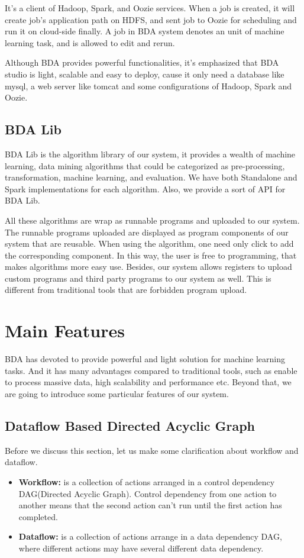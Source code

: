 \documentclass{sig-alternate-05-2015}
\begin{document}
It's a client of Hadoop, Spark, and Oozie services. When a job is created, it will create job's application path on HDFS, and sent job to Oozie for scheduling and run it on cloud-side finally. A job in BDA system denotes an unit of machine learning task, and is allowed to edit and rerun.

Although BDA provides powerful functionalities, it's emphasized that BDA studio is light, scalable and easy to deploy, cause it only need a database like mysql, a web server like tomcat and some configurations of Hadoop, Spark and Oozie.


\subsection{BDA Lib}
BDA Lib is the algorithm library of our system, it provides a wealth of machine learning, data mining algorithms that could be categorized as pre-processing, transformation, machine learning, and evaluation. We have both Standalone and Spark implementations for each algorithm. Also, we provide a sort of API for BDA Lib. 

All these algorithms are wrap as runnable programs and uploaded to our system. The runnable programs uploaded are displayed as program components of our system that are reusable. When using the algorithm, one need only click to add the corresponding component. In this way, the user is free to programming, that makes algorithms more easy use. Besides, our system allows registers to upload custom programs and third party programs to our system as well. This is different from traditional tools that are forbidden program upload.

\section{Main Features}
BDA has devoted to provide powerful and light solution for machine learning tasks. And it has many advantages compared to traditional tools, such as enable to process massive data, high scalability and performance etc. Beyond that, we are going to introduce some particular features of our system.

\subsection{Dataflow Based Directed Acyclic Graph}
Before we discuss this section, let us make some clarification about workflow and dataflow.

\begin{itemize}
\item \textbf{Workflow:} is a collection of actions arranged in a control dependency DAG(Directed Acyclic Graph). Control dependency from one action to another means that the second action can't run until the first action has completed.
\item \textbf{Dataflow:} is a collection of actions arrange in a data dependency DAG, where different actions may have several different data dependency.
\end{itemize}
\end{document}
